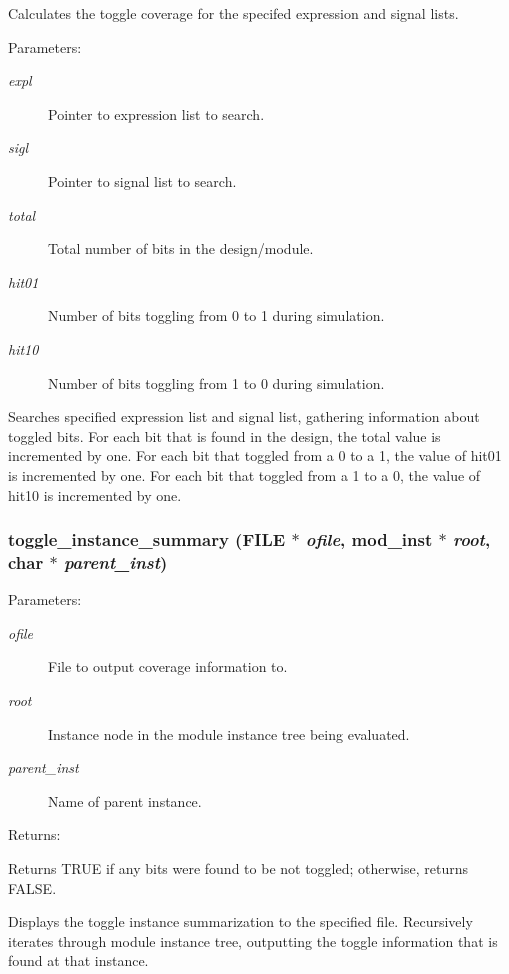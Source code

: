 Calculates the toggle coverage for the specifed expression and signal lists.

\begin{Desc}
\item[Parameters: ]\par
\begin{description}
\item[{\em 
expl}]Pointer to expression list to search. \item[{\em 
sigl}]Pointer to signal list to search. \item[{\em 
total}]Total number of bits in the design/module. \item[{\em 
hit01}]Number of bits toggling from 0 to 1 during simulation. \item[{\em 
hit10}]Number of bits toggling from 1 to 0 during simulation.\end{description}
\end{Desc}
Searches specified expression list and signal list, gathering information  about toggled bits. For each bit that is found in the design, the total value is incremented by one. For each bit that toggled from a 0 to a 1, the value of hit01 is incremented by one. For each bit that toggled from a 1 to a 0, the value of hit10 is incremented by one. 
\subsubsection{ toggle\_\-instance\_\-summary (FILE $\ast$ {\em ofile}, {\bf mod\_\-inst} $\ast$ {\em root}, char $\ast$ {\em parent\_\-inst})}\label{toggle_8c_a4}


\begin{Desc}
\item[Parameters: ]\par
\begin{description}
\item[{\em 
ofile}]File to output coverage information to. \item[{\em 
root}]Instance node in the module instance tree being evaluated. \item[{\em 
parent\_\-inst}]Name of parent instance.\end{description}
\end{Desc}
\begin{Desc}
\item[Returns: ]\par
Returns TRUE if any bits were found to be not toggled; otherwise, returns FALSE.\end{Desc}
Displays the toggle instance summarization to the specified file. Recursively iterates through module instance tree, outputting the toggle information that is found at that instance. 
